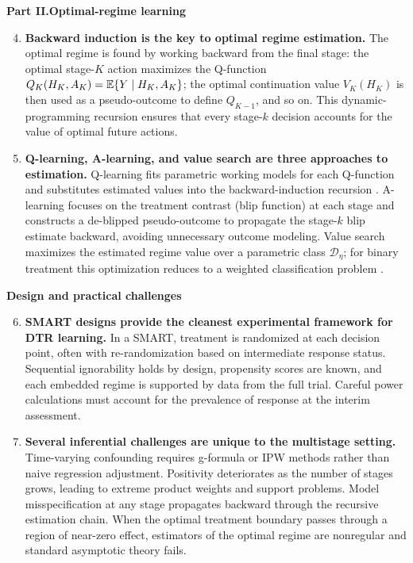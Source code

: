 \documentclass[master.tex]{subfiles}
\begin{document}
\medskip
\noindent\textbf{Part II.\enspace Optimal-regime learning}
\medskip

\begin{enumerate}
  \setcounter{enumi}{3}

  \item \textbf{Backward induction is the key to optimal regime
    estimation.}  The optimal regime is found by working backward from the
    final stage: the optimal stage-$K$ action maximizes the Q-function
    $Q_K(H_K,A_K) = \mathbb{E}\{Y\mid H_K,A_K\}$; the optimal continuation value
    $V_K(H_K)$ is then used as a pseudo-outcome to define $Q_{K-1}$, and
    so on.  This dynamic-programming recursion ensures that every
    stage-$k$ decision accounts for the value of optimal future actions.

  \item \textbf{Q-learning, A-learning, and value search are three
    approaches to estimation.}  Q-learning fits parametric working models
    for each Q-function and substitutes estimated values into the
    backward-induction recursion \citep{zhang2018b}.  A-learning focuses
    on the treatment contrast (blip function) at each stage and constructs
    a de-blipped pseudo-outcome to propagate the stage-$k$ blip estimate
    backward, avoiding unnecessary outcome modeling.  Value search
    maximizes the estimated regime value over a parametric class
    $\mathcal{D}_\eta$; for binary treatment this optimization reduces to
    a weighted classification problem \citep{zhao2015b,zhang2018}.

\end{enumerate}

\medskip
\noindent\textbf{Design and practical challenges}
\medskip

\begin{enumerate}
  \setcounter{enumi}{5}

  \item \textbf{SMART designs provide the cleanest experimental framework
    for DTR learning.}  In a SMART, treatment is randomized at each
    decision point, often with re-randomization based on intermediate
    response status.  Sequential ignorability holds by design, propensity
    scores are known, and each embedded regime is supported by data from
    the full trial.  Careful power calculations must account for the
    prevalence of response at the interim assessment.

  \item \textbf{Several inferential challenges are unique to the
    multistage setting.}  Time-varying confounding requires g-formula or
    IPW methods rather than naive regression adjustment.  Positivity
    deteriorates as the number of stages grows, leading to extreme product
    weights and support problems.  Model misspecification at any stage
    propagates backward through the recursive estimation chain.  When the
    optimal treatment boundary passes through a region of near-zero
    effect, estimators of the optimal regime are nonregular and standard
    asymptotic theory fails.

\end{enumerate}
\end{document}
